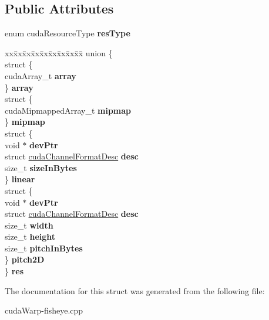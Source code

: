 \subsection*{Public Attributes}
\begin{DoxyCompactItemize}
\item 
enum cuda\+Resource\+Type {\bfseries res\+Type}\hypertarget{structcudaResourceDesc_aaac8b3bb1d63bd25d8e9af7ee0b9a580}{}\label{structcudaResourceDesc_aaac8b3bb1d63bd25d8e9af7ee0b9a580}

\item 
\begin{tabbing}
xx\=xx\=xx\=xx\=xx\=xx\=xx\=xx\=xx\=\kill
union \{\\
\>struct \{\\
\>\>cudaArray\_t {\bfseries array}\\
\>\} {\bfseries array}\\
\>struct \{\\
\>\>cudaMipmappedArray\_t {\bfseries mipmap}\\
\>\} {\bfseries mipmap}\\
\>struct \{\\
\>\>void $\ast$ {\bfseries devPtr}\\
\>\>struct \hyperlink{structcudaChannelFormatDesc}{cudaChannelFormatDesc} {\bfseries desc}\\
\>\>size\_t {\bfseries sizeInBytes}\\
\>\} {\bfseries linear}\\
\>struct \{\\
\>\>void $\ast$ {\bfseries devPtr}\\
\>\>struct \hyperlink{structcudaChannelFormatDesc}{cudaChannelFormatDesc} {\bfseries desc}\\
\>\>size\_t {\bfseries width}\\
\>\>size\_t {\bfseries height}\\
\>\>size\_t {\bfseries pitchInBytes}\\
\>\} {\bfseries pitch2D}\\
\} {\bfseries res}\hypertarget{structcudaResourceDesc_a5c9931600ee15fe93e0dd09bb2aca440}{}\label{structcudaResourceDesc_a5c9931600ee15fe93e0dd09bb2aca440}
\\

\end{tabbing}\end{DoxyCompactItemize}


The documentation for this struct was generated from the following file\+:\begin{DoxyCompactItemize}
\item 
cuda\+Warp-\/fisheye.\+cpp\end{DoxyCompactItemize}

